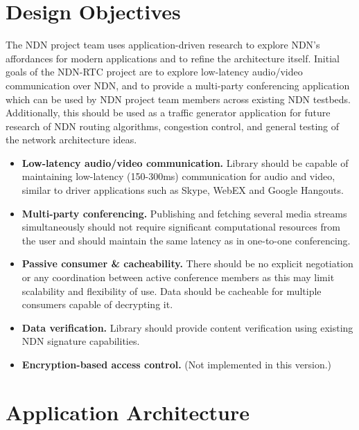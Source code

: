 \documentclass{icn/sig-alternate-2012} %
\newcommand{\ndnrtcName}{NDN-RTC} %
\begin{document}
\section{Design Objectives}
\label{sec:goals}
The NDN project team uses application-driven research to explore NDN's affordances for modern applications and to refine the architecture itself.  Initial goals of the \ndnrtcName{} project are to explore low-latency audio/video communication over NDN, and to provide a multi-party conferencing application which can be used by NDN project team members across existing NDN testbeds. Additionally, this should be used as a traffic generator application for future research of NDN routing algorithms, congestion control, and general testing of the network architecture ideas.
\begin{itemize}
\item \textbf{Low-latency audio/video communication.} Library should be capable of maintaining low-latency (150-300ms) communication for audio and video, similar to driver applications such as Skype, WebEX and Google Hangouts.

\item \textbf{Multi-party conferencing.} Publishing and fetching several media streams simultaneously should not require significant computational resources from the user and should maintain the same latency as in one-to-one conferencing.

\item \textbf{Passive consumer \& cacheability.} There should be no explicit negotiation or any coordination between active conference members as this may limit scalability and flexibility of use. Data should be cacheable for multiple consumers capable of decrypting it. 

\item \textbf{Data verification.} Library should provide content verification using existing NDN signature capabilities. 

\item \textbf{Encryption-based access control.}   (Not implemented in this version.)
\end{itemize} 

\section{Application Architecture}
\label{sec:arch}
\end{document}
